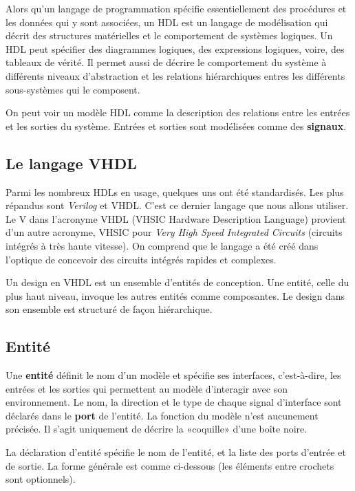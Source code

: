 \documentclass[11pt]{article}
\begin{document}
Alors qu'un langage de programmation spécifie essentiellement des
procédures et les données qui y sont associées, un HDL est un langage
de modélisation qui décrit des structures matérielles et le
comportement de systèmes logiques. Un HDL peut spécifier des
diagrammes logiques, des expressions logiques, voire, des tableaux de
vérité. Il permet aussi de décrire le comportement du système à
différents niveaux d'abstraction et les relations hiérarchiques entres
les différents sous-systèmes qui le composent.

On peut voir un modèle HDL comme la description des relations entre
les entrées et les sorties du système. Entrées et sorties sont
modélisées comme des \textbf{signaux}.

\subsection{Le langage VHDL}
\label{sec:org2cb71eb}

Parmi les nombreux HDLs en usage, quelques uns ont été
standardisés. Les plus répandus sont \emph{Verilog} et VHDL. C'est ce
dernier langage que nous allons utiliser.  Le V dans l'acronyme VHDL
(VHSIC Hardware Description Language) provient d'un autre acronyme,
VHSIC pour \emph{Very High Speed Integrated Circuits} (circuits intégrés à
très haute vitesse). On comprend que le langage a été créé dans
l'optique de concevoir des circuits intégrés rapides et complexes.

Un design en VHDL est un ensemble d'entités de conception. Une entité,
celle du plus haut niveau, invoque les autres entités comme
composantes.  Le design dans son ensemble est structuré de façon
hiérarchique.

\subsection{Entité}
\label{sec:orgb7052af}

Une \textbf{entité} définit le nom d'un modèle et spécifie ses interfaces,
c'est-à-dire, les entrées et les sorties qui permettent au modèle
d'interagir avec son environnement. Le nom, la direction et le type
de chaque signal d'interface sont déclarés dans le \textbf{port} de
l'entité. La fonction du modèle n'est aucunement précisée. Il s'agit
uniquement de décrire la «coquille» d'une boîte noire.

La déclaration d'entité spécifie le nom de l'entité, et la liste des
ports d'entrée et de sortie. La forme générale est comme ci-dessous (les
éléments entre crochets sont optionnels). 
\end{document}
